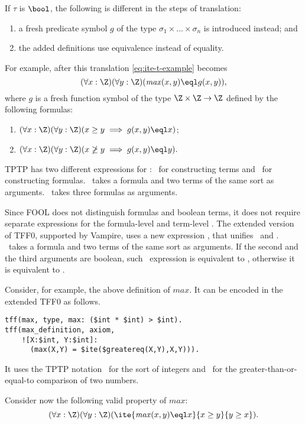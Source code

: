 If $\tau$ is $\bool$, the following is different in the steps of translation:
\begin{enumerate}
  \item a fresh predicate symbol $g$ of the type $\sigma_1 \times \ldots \times \sigma_n$ is introduced instead; and
  \item the added definitions use equivalence instead of equality.
\end{enumerate}
\noindent
For example, after this translation \eqref{eq:ite-t-example} becomes $$(\forall x:\Z)(\forall y:\Z)(\mathit{max}(x, y) \eql g(x, y)),$$ where $g$ is a fresh function symbol of the type $\Z \times \Z \to \Z$ defined by the following formulas:
\begin{enumerate}
  \item $(\forall x:\Z)(\forall y:\Z)(x \geq y \implies g(x, y) \eql x)$;
  \item $(\forall x:\Z)(\forall y:\Z)(x \not\geq y \implies g(x, y) \eql y).$
\end{enumerate}

TPTP has two different expressions for \ITE: \ditet\ for constructing terms and \ditef\ for constructing formulas. \ditet\ takes a formula and two terms of the same sort as arguments. \ditef\ takes three formulas as arguments.

Since FOOL does not distinguish formulas and boolean terms, it does not require separate expressions for the formula-level and term-level \ITE. The extended version of TFF0, supported by Vampire, uses a new expression \dite, that unifies \ditet\ and \ditef. \dite\ takes a formula and two terms of the same sort as arguments. If the second and the third arguments are boolean, such \dite\  expression is equivalent to \ditef, otherwise it is equivalent to \ditet.

Consider, for example, the above definition of $\mathit{max}$. It can be encoded in the extended TFF0 as follows.
\begin{lstlisting}
tff(max, type, max: ($int * $int) > $int).
tff(max_definition, axiom,
    ![X:$int, Y:$int]:
      (max(X,Y) = $ite($greatereq(X,Y),X,Y))).
\end{lstlisting}It uses the TPTP notation \dint\ for the sort of integers and \dgreatereq\ for the greater-than-or-equal-to comparison of two numbers.



Consider now the following valid property of $\mathit{max}$:
\begin{equation}\label{eq:ite-f-example}
  (\forall x:\Z)(\forall y:\Z)(\ite{\mathit{max}(x, y) \eql x}{x \geq y}{y \geq x}).
\end{equation}

